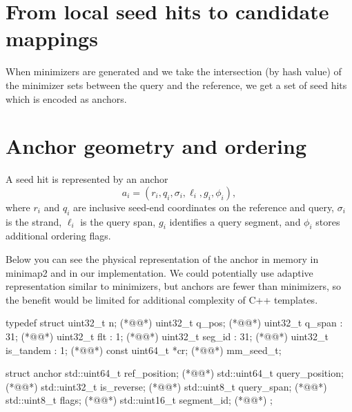 \section{From local seed hits to candidate mappings}
\label{sec:chaining-purpose}

When minimizers are generated and we take the intersection (by hash value) of the minimizer sets between the query and the reference, we get a set of seed hits which is encoded as anchors.

\section{Anchor geometry and ordering}
\label{sec:chaining-geometry}

A seed hit is represented by an anchor
\[
  a_i=(r_i,q_i,\sigma_i,\ell_i,g_i,\phi_i),
\]
where \(r_i\) and \(q_i\) are inclusive seed-end coordinates on the reference
and query, \(\sigma_i\) is the strand, \(\ell_i\) is the query span, \(g_i\)
identifies a query segment, and \(\phi_i\) stores additional ordering flags.

Below you can see the physical representation of the anchor in memory in minimap2 and in our implementation. We could potentially use adaptive representation similar to minimizers, but anchors are fewer than minimizers, so the benefit would be limited for additional complexity of C++ templates.

\begin{BioseqCppSnippet}
  typedef struct {
    uint32_t n;                    (*@@*)
    uint32_t q_pos;                (*@@*)
    uint32_t q_span       : 31;    (*@@*)
    uint32_t flt          : 1;     (*@@*)
    uint32_t seg_id       : 31;    (*@@*)
    uint32_t is_tandem    : 1;     (*@@*)
    const uint64_t *cr;            (*@@*)
  } mm_seed_t;
\end{BioseqCppSnippet}
\begin{BioseqCppSnippet}
  struct anchor {
    std::uint64_t ref_position;    (*@@*)
    std::uint64_t query_position;  (*@@*)
    std::uint32_t is_reverse;      (*@@*)
    std::uint8_t query_span;       (*@@*)
    std::uint8_t flags;            (*@@*)
    std::uint16_t segment_id;      (*@@*)
  };
\end{BioseqCppSnippet}

